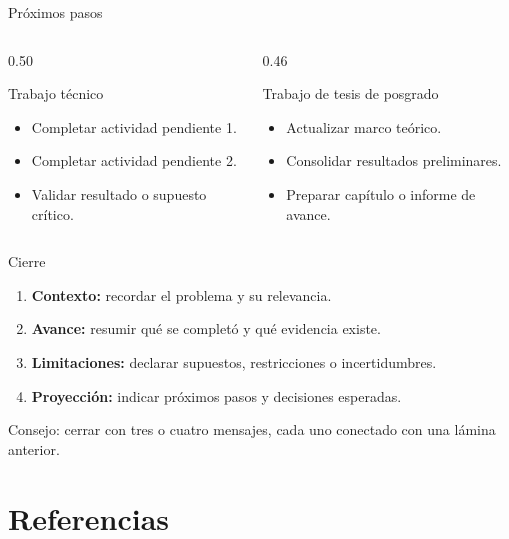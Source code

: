 \begin{frame}{Próximos pasos}
  \begin{columns}[T,onlytextwidth]
    \begin{column}{0.50\textwidth}
      \begin{UCBlock}{Trabajo técnico}
        \begin{itemize}
          \item Completar actividad pendiente 1.
          \item Completar actividad pendiente 2.
          \item Validar resultado o supuesto crítico.
        \end{itemize}
      \end{UCBlock}
    \end{column}
    \begin{column}{0.46\textwidth}
      \begin{UCBlock}{Trabajo de tesis de posgrado}
        \begin{itemize}
          \item Actualizar marco teórico.
          \item Consolidar resultados preliminares.
          \item Preparar capítulo o informe de avance.
        \end{itemize}
      \end{UCBlock}
    \end{column}
  \end{columns}
\end{frame}

\begin{frame}{Cierre}
  \begin{enumerate}
    \item \textbf{Contexto:} recordar el problema y su relevancia.
    \item \textbf{Avance:} resumir qué se completó y qué evidencia existe.
    \item \textbf{Limitaciones:} declarar supuestos, restricciones o incertidumbres.
    \item \textbf{Proyección:} indicar próximos pasos y decisiones esperadas.
  \end{enumerate}
  \begin{UCKeyPoint}
    Consejo: cerrar con tres o cuatro mensajes, cada uno conectado con una lámina anterior.
  \end{UCKeyPoint}
\end{frame}

\section{Referencias}

